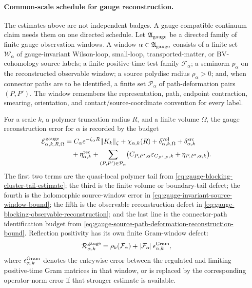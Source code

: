\paragraph{Common-scale schedule for gauge reconstruction.}
The estimates above are not independent badges.  A gauge-compatible continuum
claim needs them on one directed schedule.  Let
\(\mathfrak A_{\rm gauge}\) be a directed family of finite gauge observation
windows.  A window \(\alpha\in\mathfrak A_{\rm gauge}\) consists of a finite
set \(\mathcal W_\alpha\) of gauge-invariant Wilson-loop, small-loop,
transported-matter, or BV-cohomology source labels; a finite positive-time
test family \(\mathcal F_\alpha\); a seminorm \(p_\alpha\) on the
reconstructed observable window; a source polydisc radius
\(\rho_\alpha>0\); and, when connector paths are to be identified, a finite
set \(\mathcal P_\alpha\) of path-deformation pairs \((P,P')\).  The
window remembers the representation, path, endpoint contraction, smearing,
orientation, and contact/source-coordinate convention for every label.

For a scale \(k\), a polymer truncation radius \(R\), and a finite volume
\(\Omega\), the gauge reconstruction error for \(\alpha\) is recorded by the
budget
\begin{equation}
\begin{aligned}
  \mathcal E_{\alpha,k,R,\Omega}^{\rm gauge}
  &=
  C_\alpha e^{-\zeta_\alpha R}\|K_k\|_{\zeta}
  +\chi_{\alpha,k}(R)
  +\delta_{\alpha,k,\Omega}^{\rm vol}
  +\delta_{\alpha,k}^{\rm src}                                      \\
  &\quad+
  \eta_{\alpha,k}^{\rm rec}
  +
  \sum_{(P,P')\in\mathcal P_\alpha}
  \bigl(
    C_{P,P',\alpha}\varepsilon_{C_{P',P},k}
    +\eta_{P,P',\alpha,k}
  \bigr).
\end{aligned}
  \label{eq:gauge-common-reconstruction-budget}
\end{equation}
The first two terms are the quasi-local polymer tail from
\eqref{eq:gauge-blocking-cluster-tail-estimate}; the third is the finite
volume or boundary-tail defect; the fourth is the holomorphic
source-window error in
\eqref{eq:gauge-invariant-source-window-bound}; the fifth is the
observable reconstruction defect in
\eqref{eq:gauge-blocking-observable-reconstruction}; and the last line is
the connector-path identification budget from
\eqref{eq:gauge-source-path-deformation-reconstruction-bound}.  Reflection
positivity has its own finite Gram-window defect:
\begin{equation}
  \mathcal R_{\alpha,k}^{\rm gauge}
  =
  \rho_{k}(\mathcal F_\alpha)
  +
  |\mathcal F_\alpha|\,
  \epsilon_{\alpha,k}^{\rm Gram},
  \label{eq:gauge-common-rp-budget}
\end{equation}
where \(\epsilon_{\alpha,k}^{\rm Gram}\) denotes the entrywise error between
the regulated and limiting positive-time Gram matrices in that window, or is
replaced by the corresponding operator-norm error if that stronger estimate
is available.

